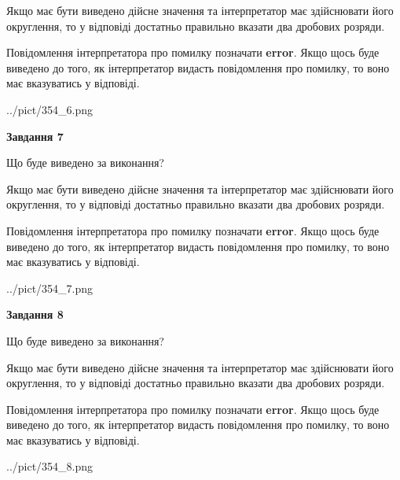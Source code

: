 \documentclass[12pt, ukrainian]{article}
\begin{document}
{\begin {Large}
Якщо має бути виведено дійсне значення та інтерпретатор має здійснювати його округлення, 
то у відповіді достатньо правильно вказати два дробових розряди.

Повідомлення інтерпретатора про помилку позначати \textbf{error}.
Якщо щось буде виведено до того, як інтерпретатор видасть повідомлення про помилку, 
то воно має вказуватись у відповіді. \par

\begin{center}
	{../pict/354_6.png}
\end{center}
\newpage

{\begin {center}\textbf{Завдання 7}\end {center}}\par
Що буде виведено за виконання? \par

Якщо має бути виведено дійсне значення та інтерпретатор має здійснювати його округлення, 
то у відповіді достатньо правильно вказати два дробових розряди.

Повідомлення інтерпретатора про помилку позначати \textbf{error}.
Якщо щось буде виведено до того, як інтерпретатор видасть повідомлення про помилку, 
то воно має вказуватись у відповіді. \par

\begin{center}
	{../pict/354_7.png}
\end{center}
\newpage

{\begin {center}\textbf{Завдання 8}\end {center}}\par
Що буде виведено за виконання? \par

Якщо має бути виведено дійсне значення та інтерпретатор має здійснювати його округлення, 
то у відповіді достатньо правильно вказати два дробових розряди.

Повідомлення інтерпретатора про помилку позначати \textbf{error}.
Якщо щось буде виведено до того, як інтерпретатор видасть повідомлення про помилку, 
то воно має вказуватись у відповіді. \par

\begin{center}
	{../pict/354_8.png}
\end{center}
\newpage


\end{Large}}
\end{document}
